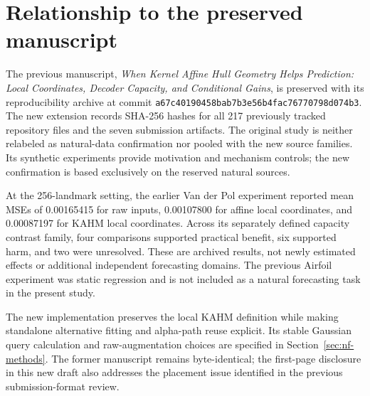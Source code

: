 \section{Relationship to the preserved manuscript}\label{app:checkpoint}
The previous manuscript, \emph{When Kernel Affine Hull Geometry Helps
Prediction: Local Coordinates, Decoder Capacity, and Conditional Gains},
is preserved with its reproducibility archive at commit
\texttt{a67c40190458bab7b3e56b4fac76770798d074b3}. The new extension records
SHA-256 hashes for all 217 previously tracked repository files and the seven
submission artifacts. The original study is neither relabeled as natural-data
confirmation nor pooled with the new source families. Its synthetic
experiments provide motivation and mechanism controls; the new confirmation
is based exclusively on the reserved natural sources.

At the 256-landmark setting, the earlier Van der Pol experiment reported mean
MSEs of 0.00165415 for raw inputs, 0.00107800 for affine local coordinates, and
0.00087197 for KAHM local coordinates. Across its separately defined capacity
contrast family, four comparisons supported practical benefit, six supported
harm, and two were unresolved. These are archived results, not newly estimated
effects or additional independent forecasting domains. The previous Airfoil
experiment was static regression and is not included as a natural forecasting
task in the present study.

The new implementation preserves the local KAHM definition while making
standalone alternative fitting and alpha-path reuse explicit. Its stable
Gaussian query calculation and raw-augmentation choices are specified in
Section~\ref{sec:nf-methods}. The former manuscript remains byte-identical;
the first-page disclosure in this new draft also addresses the placement
issue identified in the previous submission-format review.

